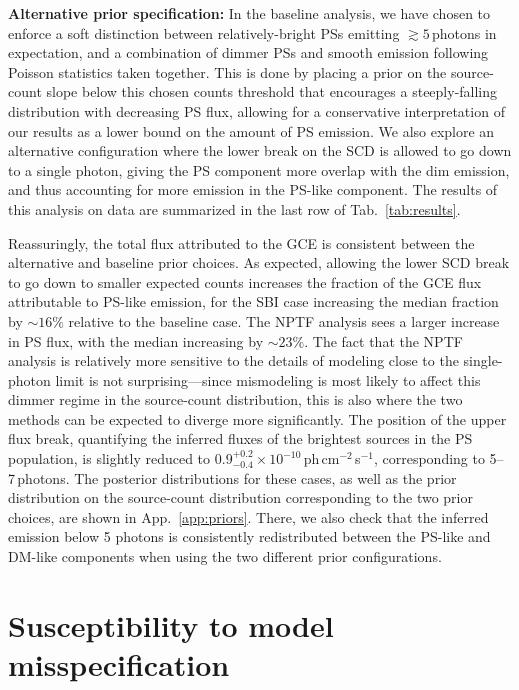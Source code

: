 \documentclass[prd,aps,10pt,nofootinbib,twocolumn,superscriptaddress,preprintnumbers,balancelastpage,longbibliography,floatfix]{revtex4-2}
\begin{document}
\noindent
\textbf{Alternative prior specification:}
In the baseline analysis, we have chosen to enforce a soft distinction between relatively-bright PSs emitting $\gtrsim 5$\,photons in expectation, and a combination of dimmer PSs and smooth emission following Poisson statistics taken together. This is done by placing a prior on the source-count slope below this chosen counts threshold that encourages a steeply-falling distribution with decreasing PS flux, allowing for a conservative interpretation of our results as a lower bound on the amount of PS emission. We also explore an alternative configuration where the lower break on the SCD is allowed to go down to a single photon, giving the PS component more overlap with the dim emission, and thus accounting for more emission in the PS-like component. The results of this analysis on data are summarized in the last row of Tab.~\ref{tab:results}.

Reassuringly, the total flux attributed to the GCE is consistent between the alternative and baseline prior choices. As expected, allowing the lower SCD break to go down to smaller expected counts increases the fraction of the GCE flux attributable to PS-like emission, for the SBI case increasing the median fraction by $\sim16\%$ relative to the baseline case. The NPTF analysis sees a larger increase in PS flux, with the median increasing by $\sim23\%$. The fact that the NPTF analysis is relatively more sensitive to the details of modeling close to the single-photon limit is not surprising---since mismodeling is most likely to affect this dimmer regime in the source-count distribution, this is also where the two methods can be expected to diverge more significantly. 
The position of the upper flux break, quantifying the inferred fluxes of the brightest sources in the PS population, is slightly reduced to $0.9^{+0.2}_{-0.4}\times 10^{-10}$\,ph\,cm$^{-2}$\,s$^{-1}$, corresponding to 5--7\,photons.
The posterior distributions for these cases, as well as the prior distribution on the source-count distribution corresponding to the two prior choices, are shown in App.~\ref{app:priors}. There, we also check that the inferred emission below 5 photons is consistently redistributed between the PS-like and DM-like components when using the two different prior configurations.

\section{Susceptibility to model misspecification}
\label{sec:mismodeling}
\end{document}
